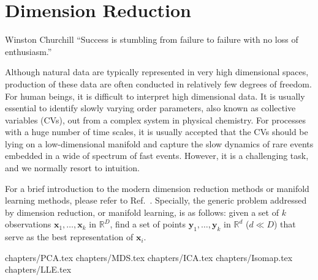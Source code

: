 \chapter{Dimension Reduction\label{chapter:DR}}
\begin{chapquote}{Winston Churchill%
	}
	``Success is stumbling from failure to failure with no loss of enthusiasm.''
\end{chapquote}
Although natural data are typically represented in very high dimensional spaces, production of these data are often conducted in relatively few degrees of freedom. For human beings, it is difficult to interpret high dimensional data. It is usually essential to identify slowly varying order parameters, also known as collective variables (CVs), out from a complex system in physical chemistry. For processes with a huge number of time scales, it is usually accepted that the CVs should be lying on a low-dimensional manifold and capture the slow dynamics of rare events embedded in a wide of spectrum of fast events. However, it is a challenging task, and we normally resort to intuition.

For a brief introduction to the modern dimension reduction methods or manifold learning methods, please refer to Ref.~\cite{IzamanWIREsCS2012}. Specially, the generic problem addressed by dimension reduction, or manifold learning, is as follows: given a set of $k$ observations $\mathbf{x}_1,\dots,\mathbf{x}_k$ in $\mathbb{R}^D$, find a set of points $\mathbf{y}_1,\dots,\mathbf{y}_k$ in $\mathbb{R}^d$ ($d\ll D$) that serve as the best representation of $\mathbf{x}_i$.

\clearpage 
 {chapters/PCA.tex}
\clearpage
 {chapters/MDS.tex}
\clearpage
 {chapters/ICA.tex}
\clearpage
 {chapters/Isomap.tex}
\clearpage
 {chapters/LLE.tex}